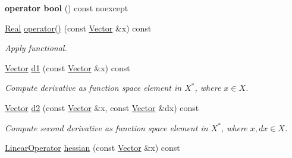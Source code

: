 \begin{DoxyCompactItemize}
\item 
\hypertarget{classSpacy_1_1C2Functional_a7305181d522d504c75c0647737fe7d15}{{\bfseries operator bool} () const noexcept}\label{classSpacy_1_1C2Functional_a7305181d522d504c75c0647737fe7d15}

\item 
\hypertarget{classSpacy_1_1C2Functional_a5dad5f40836b6f43662db0a01fd32347}{\hyperlink{classSpacy_1_1Real}{\-Real} \hyperlink{classSpacy_1_1C2Functional_a5dad5f40836b6f43662db0a01fd32347}{operator()} (const \hyperlink{classSpacy_1_1Vector}{\-Vector} \&x) const }\label{classSpacy_1_1C2Functional_a5dad5f40836b6f43662db0a01fd32347}

\begin{DoxyCompactList}\small\item\em \-Apply functional. \end{DoxyCompactList}\item 
\hypertarget{classSpacy_1_1C2Functional_a7278ddf3337cc28d138a02d18ad44404}{\hyperlink{classSpacy_1_1Vector}{\-Vector} \hyperlink{classSpacy_1_1C2Functional_a7278ddf3337cc28d138a02d18ad44404}{d1} (const \hyperlink{classSpacy_1_1Vector}{\-Vector} \&x) const }\label{classSpacy_1_1C2Functional_a7278ddf3337cc28d138a02d18ad44404}

\begin{DoxyCompactList}\small\item\em \-Compute derivative as function space element in $X^*$, where $x\in X$. \end{DoxyCompactList}\item 
\hypertarget{classSpacy_1_1C2Functional_af2f8671e8ebb9079255afc39a495859d}{\hyperlink{classSpacy_1_1Vector}{\-Vector} \hyperlink{classSpacy_1_1C2Functional_af2f8671e8ebb9079255afc39a495859d}{d2} (const \hyperlink{classSpacy_1_1Vector}{\-Vector} \&x, const \hyperlink{classSpacy_1_1Vector}{\-Vector} \&dx) const }\label{classSpacy_1_1C2Functional_af2f8671e8ebb9079255afc39a495859d}

\begin{DoxyCompactList}\small\item\em \-Compute second derivative as function space element in $X^*$, where $x,dx\in X$. \end{DoxyCompactList}\item 
\hypertarget{classSpacy_1_1C2Functional_a97eeeb376ed178ea7e2f109967f99c24}{\hyperlink{classSpacy_1_1LinearOperator}{\-Linear\-Operator} \hyperlink{classSpacy_1_1C2Functional_a97eeeb376ed178ea7e2f109967f99c24}{hessian} (const \hyperlink{classSpacy_1_1Vector}{\-Vector} \&x) const }\label{classSpacy_1_1C2Functional_a97eeeb376ed178ea7e2f109967f99c24}


\end{DoxyCompactItemize}
